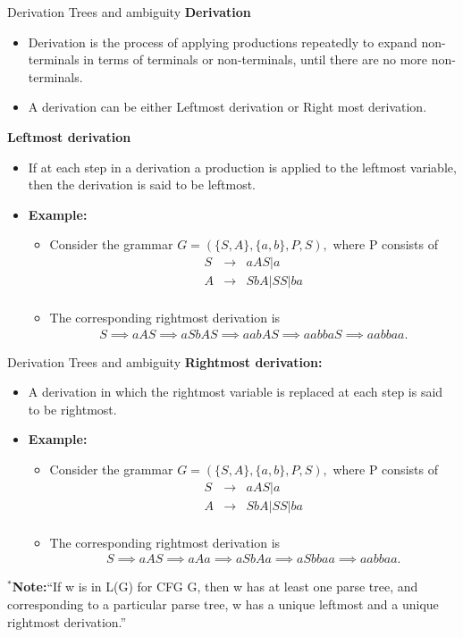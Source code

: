 \documentclass{beamer}
\begin{document}
\begin{frame}{Derivation Trees and ambiguity}
	\textbf{Derivation}
	\begin{itemize}
		\item Derivation is the process of applying productions repeatedly to expand non-terminals in terms of terminals or non-terminals, until there are no more 
		non-terminals.
		\item A derivation can be either Leftmost derivation or Right most 
		derivation.

		
	\end{itemize}
\textbf{Leftmost derivation}
\begin{itemize}
	\item If at each step in a derivation a production is applied to the leftmost 
	variable, then the derivation is said to be leftmost.
	\item \textbf{Example:}
	\begin{itemize}
		\item Consider the grammar $G = (\{S, A\}, \{a, b\}, P, S),$ where P consists of 
		\begin{eqnarray*}
		S& \rightarrow &aAS | a \\
		A& \rightarrow &SbA|SS|ba\\
\end{eqnarray*}
\item The corresponding rightmost derivation is 
	\begin{eqnarray*}
S \implies aAS \implies aSbAS \implies aabAS \implies aabbaS \implies aabbaa.
\end{eqnarray*}
	\end{itemize}
\end{itemize}
\end{frame}
\begin{frame}{Derivation Trees and ambiguity}
	\textbf{Rightmost derivation:}
	\begin{itemize}
		\item A derivation in which the rightmost variable is replaced at each step is said 
		to be rightmost.
		\item \textbf{Example:}
		\begin{itemize}
			\item Consider the grammar $G = (\{S, A\}, \{a, b\}, P, S),$ where P consists of 
			\begin{eqnarray*}
				S& \rightarrow &aAS | a \\
				A& \rightarrow &SbA|SS|ba\\
			\end{eqnarray*}
			\item The corresponding rightmost derivation is 
			\begin{eqnarray*}
				S \implies aAS \implies aAa \implies aSbAa \implies aSbbaa \implies aabbaa.
			\end{eqnarray*}
		\end{itemize}
	\end{itemize}
$^*$\textbf{Note:}“If w is in L(G) for CFG G, then w has at least one parse tree, and 
corresponding to a particular parse tree, w has a unique leftmost and a 
unique rightmost derivation.”

\end{frame}
\end{document}
